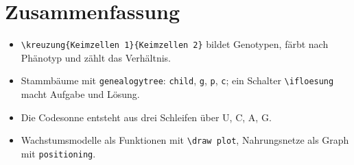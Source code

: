 \section{Zusammenfassung}

\begin{itemize}
	\item \texttt{\textbackslash kreuzung\{Keimzellen 1\}\{Keimzellen 2\}} bildet Genotypen, färbt nach Phänotyp und zählt das Verhältnis.
	\item Stammbäume mit \texttt{genealogytree}: \texttt{child}, \texttt{g}, \texttt{p}, \texttt{c}; ein Schalter \texttt{\textbackslash ifloesung} macht Aufgabe und Lösung.
	\item Die Codesonne entsteht aus drei Schleifen über U, C, A, G.
	\item Wachstumsmodelle als Funktionen mit \texttt{\textbackslash draw plot}, Nahrungsnetze als Graph mit \texttt{positioning}.
\end{itemize}


